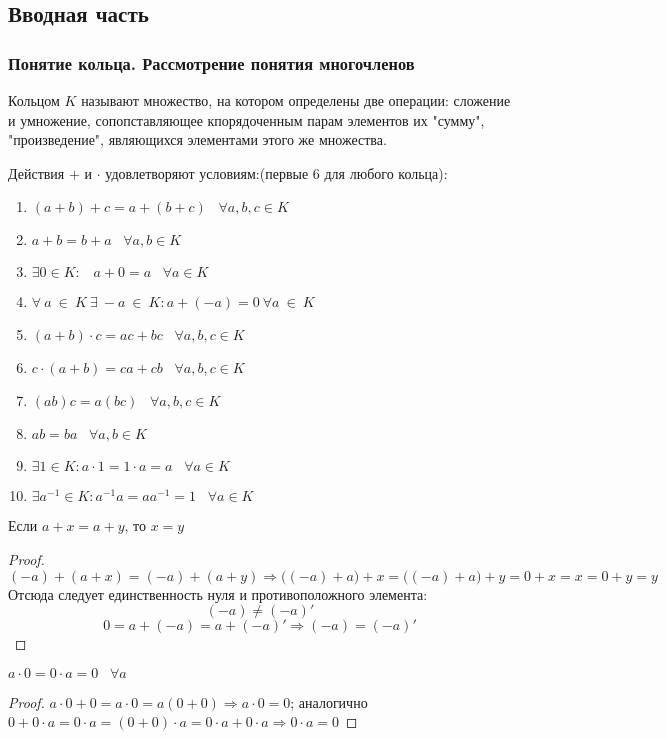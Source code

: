 \subsection{Вводная часть}
\subsubsection{Понятие кольца. Рассмотрение понятия многочленов}
\begin{definition}
Кольцом $K$ называют множество, на котором определены две операции: сложение и умножение, сопопставляющее кпорядоченным парам элементов их "сумму", "произведение", являющихся элементами этого же множества.
\end{definition}
Действия $+$ и $\cdot$ удовлетворяют условиям:(первые $6$ для любого кольца):
\begin{enumerate}
    \item $(a+b)+c=a+(b+c)\;\;\;\forall a,b,c \in K$
    \item $a+b=b+a\;\;\;\forall a,b\in K$
    \item $\exists 0\in K:\;\;\; a+0=a \;\;\;\forall a\in K$
    \item $\forall ~ a ~ \in ~ K ~ \exists ~ -a ~ \in ~ K: a+(-a)=0 ~ \forall a ~\in ~ K$
    \item $(a+b) \cdot c = ac + bc \;\;\; \forall a,b,c \in K$
    \item $c\cdot(a+b)=ca+cb\;\;\; \forall a,b,c\in K$
    \item $(ab)c=a(bc)\;\;\; \forall a,b,c\in K$
    \item $ab=ba \;\;\;\forall a,b\in K$
    \item $\exists 1\in K: a\cdot 1 =1\cdot a = a\;\;\;\forall a\in K$
    \item $\exists a^{-1} \in K: a^{-1}a=aa^{-1}=1\;\;\;\forall a\in K$
\end{enumerate}
\begin{proposition}
Если $a+x=a+y$, то $x=y$
\end{proposition}
\begin{proof}
$$(-a)+(a+x)=(-a)+(a+y)\Rightarrow \big((-a)+a\big) +x= \big((-a)+a\big) +y=0+x=x=0+y=y$$
Отсюда следует единственность нуля и противоположного элемента:
$$(-a)\neq (-a)'$$$$0=a+(-a)=a+(-a)'\Rightarrow(-a)=(-a)'$$
\end{proof}
\begin{proposition}
$a\cdot 0=0\cdot a=0 \;\;\;\forall a$
\end{proposition}
\begin{proof}
$a \cdot 0+0=a \cdot 0 = a(0+0) \Rightarrow a \cdot 0 =0$; аналогично $0+0 \cdot a=0 \cdot a=(0 + 0) \cdot a =0 \cdot a + 0 \cdot a \Rightarrow 0 \cdot a =0$
\end{proof}
